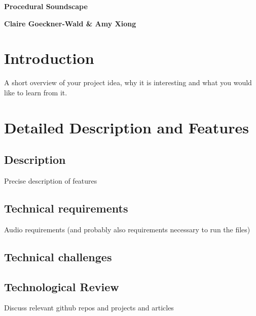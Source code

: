 \documentclass[12pt,a4paper]{article}
\begin{document}
\pagestyle{plain}
 

\begin{center}
{\LARGE{\bf
{{Procedural Soundscape}}
}}
\end{center}
\bigskip

\centerline{\bf 
{Claire Goeckner-Wald \& Amy Xiong}}

\bigskip



\section{Introduction}

A short overview of your project idea, why it is interesting and what you would like to learn from it.


\section{Detailed Description and Features}

\subsection{Description}
Precise description of features
\subsection{Technical requirements}
Audio requirements (and probably also requirements necessary to run the files)
\subsection{Technical challenges}
\subsection{Technological Review}
Discuss relevant github repos and projects and articles
\end{document}
